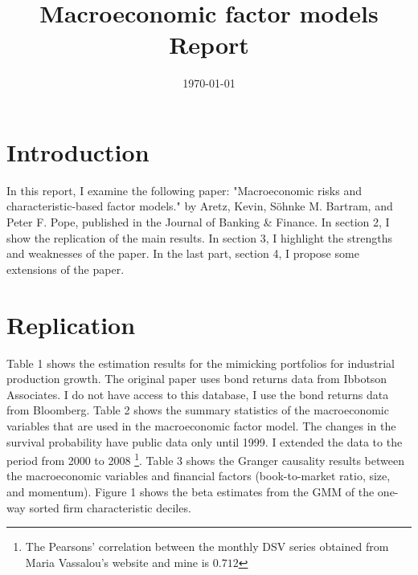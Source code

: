 \documentclass[12pt,a4paper]{ouparticle}
\begin{document}
\title{%
  Macroeconomic factor models   \\
  \large Report}

\author{%
}

\date{\today}

\maketitle


\section{Introduction}
In this report, I examine the following paper: "Macroeconomic risks and characteristic-based factor models." by Aretz, Kevin, Söhnke M. Bartram, and Peter F. Pope, published in the Journal of Banking \& Finance. In section 2, I show the replication of the main results. In section 3, I highlight the strengths and weaknesses of the paper. In the last part, section 4, I propose some extensions of the paper. 


\section{Replication}
Table 1 shows the estimation results for the mimicking portfolios for industrial production growth. The original paper uses bond returns data from Ibbotson Associates. I do not have access to this database, I use the bond returns data from Bloomberg. Table 2 shows the summary statistics of the macroeconomic variables that are used in the macroeconomic factor model. The changes in the survival probability have public data only until 1999. I extended the data to the period from 2000 to 2008 \footnote{The Pearsons' correlation between the monthly DSV series obtained from Maria Vassalou’s website and mine is $0.712$}. Table 3 shows the Granger causality results between the macroeconomic variables and financial factors (book-to-market ratio, size, and momentum). Figure 1 shows the beta estimates from the GMM of the one-way sorted firm characteristic deciles. 
\end{document}
